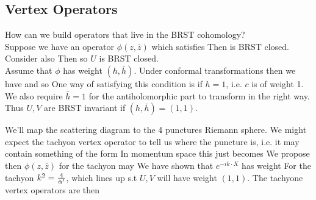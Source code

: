 \documentclass{article}
\begin{document}
\subsection{Vertex Operators}
How can we build operators that live in the BRST cohomology? \\
Suppose we have an operator $\phi(z,\bar{z})$ which satisfies 
Then 
is BRST closed. Consider also 
Then 
so $U$ is BRST closed. \\
Assume that $\phi$ has weight $(h, \bar{h})$. Under conformal transformations then we have
and so 
One way of satisfying this condition is if $h=1$, i.e. $c$ is of weight 1. \\
We also require $\bar{h}=1$ for the antiholomorphic part to transform in the right way.
Thus $U,V$ are BRST invariant if $(h,\bar{h}) = (1,1)$. 


\begin{example}[Tachyons]
We'll map the scattering diagram to the 4 punctures Riemann sphere. We might expect the tachyon vertex operator to tell us where the puncture is, i.e. it may contain something of the form 
In momentum space this just becomes 
We propose then $\phi(z,\bar{z})$ for the tachyon may 
We have shown that $e^{-ik\cdot X}$ has weight 
For the tachyon $k^2 = \frac{4}{\alpha^\prime}$, which lines up s.t $U,V$ will have weight $(1,1)$. The tachyone vertex operators are then
\end{example}
\end{document}
